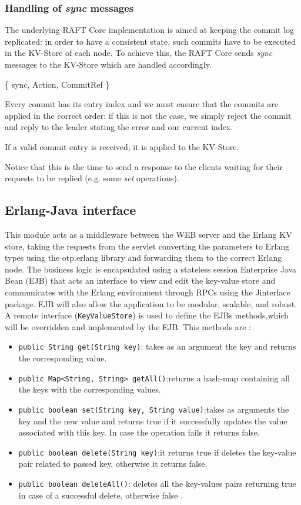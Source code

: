 \documentclass[a4paper]{article}
\begin{document}
\subsubsection{Handling of \emph{sync} messages}
\label{p:sync-hand}
The underlying RAFT Core implementation is aimed at keeping the commit log replicated: in order to have a consistent state, such commits have to be executed in the KV-Store of each node.
To achieve this, the RAFT Core sends \emph{sync} messages to the KV-Store which are handled accordingly.
\begin{center}
  \{ sync, Action, CommitRef \}
\end{center}
Every commit has its entry index and we must ensure that the commits are applied in the correct order: if this is not the case, we simply reject the commit and reply to the leader stating the error and our current index.

If a valid commit entry is received, it is applied to the KV-Store.

Notice that this is the time to send a response to the clients waiting for their requests to be replied (e.g. some \emph{set} operations).


\subsection{Erlang-Java interface}
This module acts as a middleware between the WEB server and the Erlang KV store, taking the requests from the servlet converting the parameters to Erlang types using the  otp.erlang library and forwarding them to the correct Erlang node.
The business logic is encapsulated  using a  stateless session Enterprise Java Bean (EJB) that  acts an interface to view and edit the key-value store and  communicates with the Erlang environment through RPCs using the Jinterface package. EJB will also allow the application to be modular, scalable, and robust.
A remote interface (\texttt{KeyValueStore}) is used to define the EJBs methods,which will be overridden and implemented by the EJB. This methods  are :
 \begin{itemize}
    \item \texttt {public String get(String key)}: takes as an argument the key and returns the corresponding value.
    \item \texttt {public Map<String, String> getAll()}:returns a hash-map containing all the keys with the corresponding values. 
    \item \texttt {public boolean set(String key, String value)}:takes as arguments the key and the new value and returns true if it successfully updates the value associated with this key. In case the operation fails it returns false. 
    \item \texttt {public boolean delete(String key)}:it returns true if deletes the key-value pair related to passed key, otherwise it returns false. 
   \item \texttt {public boolean deleteAll()}: deletes all the key-values pairs returning true in case of a successful delete, otherwise false .
 \end{itemize}
\end{document}
